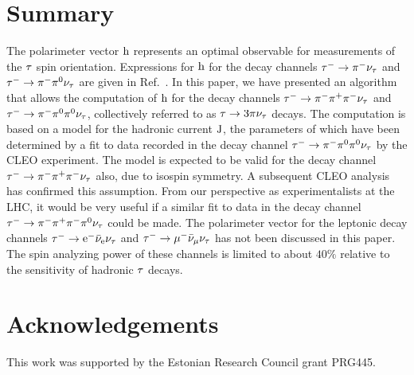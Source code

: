 \section{Summary}
\label{sec:Summary}

The polarimeter vector $\textrm{h}$ represents an optimal observable for measurements of the $\tau$ spin orientation.
Expressions for $\textrm{h}$ for the decay channels $\tau^{-} \to \pi^{-}\nu_{\tau}$ and $\tau^{-} \to \pi^{-}\pi^{\textrm{0}}\nu_{\tau}$ are given in Ref.~\cite{Jadach:1990mz}. In this paper, we have presented an algorithm that allows the computation of $\textrm{h}$ for the decay channels $\tau^{-} \to \pi^{-}\pi^{+}\pi^{-}\nu_{\tau}$ and $\tau^{-} \to \pi^{-}\pi^{\textrm{0}}\pi^{\textrm{0}}\nu_{\tau}$, collectively referred to as $\tau \to 3 \pi\nu_{\tau}$ decays. The computation is based on a model for the hadronic current $\textrm{J}$, the parameters of which have been determined by a fit to data recorded in the decay channel $\tau^{-} \to \pi^{-}\pi^{\textrm{0}}\pi^{\textrm{0}}\nu_{\tau}$ by the CLEO experiment. The model is expected to be valid for the decay channel $\tau^{-} \to \pi^{-}\pi^{+}\pi^{-}\nu_{\tau}$ also, due to isospin symmetry.
A subsequent CLEO analysis has confirmed this assumption.
From our perspective as experimentalists at the LHC, it would be very useful if a similar fit to data in the decay channel $\tau^{-} \to \pi^{-}\pi^{+}\pi^{-}\pi^{\textrm{0}}\nu_{\tau}$ could be made.
The polarimeter vector for the leptonic decay channels $\tau^{-} \to \textrm{e}^{-}\bar{\nu}_{\textrm{e}}\nu_{\tau}$ and $\tau^{-} \to \mu^{-}\bar{\nu}_{\mu}\nu_{\tau}$ has not been discussed in this paper. The spin analyzing power of these channels is limited to about $40\%$ relative to the sensitivity of hadronic $\tau$ decays.


\section*{Acknowledgements}
This work was supported by the Estonian Research Council grant PRG445.



 

